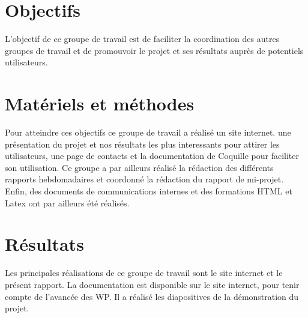 
\section{Objectifs}
L'objectif de ce groupe de travail est de faciliter la coordination des autres groupes de travail et de promouvoir le projet et ses résultats auprès de potentiels utilisateurs.


\section{Matériels et méthodes}
Pour atteindre ces objectifs ce groupe de travail a réalisé un site internet. %
 une présentation du projet et nos résultats les plus interessants pour attirer les utilisateurs,
 une page de contacts et la documentation de Coquille
 pour faciliter son utilisation.
Ce groupe a par ailleurs réalisé la rédaction des différents rapports hebdomadaires et coordonné la rédaction du rapport de mi-projet. 
Enfin, des documents de communications internes et des formations HTML et Latex ont par ailleurs été réalisés.

\section{Résultats}
Les principales réalisations de ce groupe de travail sont le site internet et le présent rapport.
La documentation est disponible sur le site internet, pour tenir compte de l'avancée des WP.
Il a réalisé les diapositives de la démonstration du projet.
